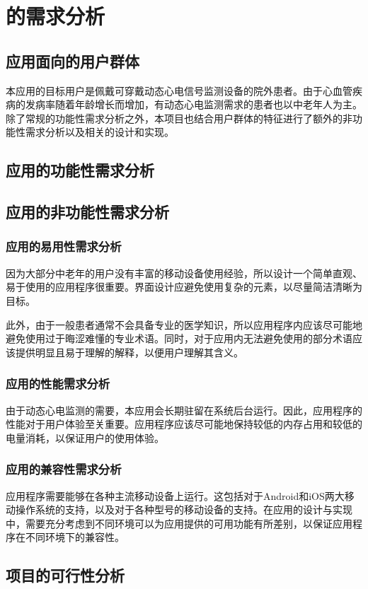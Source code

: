 

\chapter{\app 的需求分析}\label{ch:req}


\section{应用面向的用户群体}\label{sec:target-user}

本应用的目标用户是佩戴可穿戴动态心电信号监测设备的院外患者。由于心血管疾病的发病率随着年龄增长而增加\cite{Zhongguoxinxieguanjiankangyujibingbaogao20212022}，有动态心电监测需求的患者也以中老年人为主。除了常规的功能性需求分析之外，本项目也结合用户群体的特征进行了额外的非功能性需求分析以及相关的设计和实现。


\section{应用的功能性需求分析}\label{sec:func-req}



\section{应用的非功能性需求分析}\label{sec:nonfunc-req}

\subsection{应用的易用性需求分析}\label{subsec:usability}

因为大部分中老年的用户没有丰富的移动设备使用经验，所以设计一个简单直观、易于使用的应用程序很重要。界面设计应避免使用复杂的元素，以尽量简洁清晰为目标。

此外，由于一般患者通常不会具备专业的医学知识，所以应用程序内应该尽可能地避免使用过于晦涩难懂的专业术语。同时，对于应用内无法避免使用的部分术语应该提供明显且易于理解的解释，以便用户理解其含义。

\subsection{应用的性能需求分析}\label{subsec:performance}

由于动态心电监测的需要，本应用会长期驻留在系统后台运行。因此，应用程序的性能对于用户体验至关重要。应用程序应该尽可能地保持较低的内存占用和较低的电量消耗，以保证用户的使用体验。

\subsection{应用的兼容性需求分析}\label{subsec:compatibility}

应用程序需要能够在各种主流移动设备上运行。这包括对于Android和iOS两大移动操作系统的支持，以及对于各种型号的移动设备的支持。在应用的设计与实现中，需要充分考虑到不同环境可以为应用提供的可用功能有所差别，以保证应用程序在不同环境下的兼容性。


\section{项目的可行性分析}\label{sec:feasibility}

